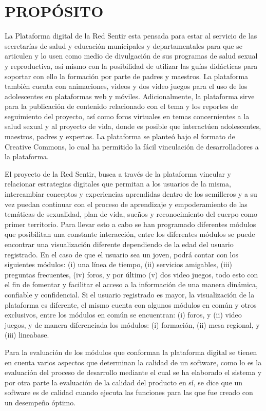 \documentclass[a4paper]{article}
\begin{document}
\section{PROPÓSITO}\label{sec:propositos}
La Plataforma digital de la Red Sentir esta pensada para estar al servicio de las secretarías de salud y educación municipales y departamentales para que se articulen y lo usen como medio de divulgación de sus programas de salud sexual y reproductiva, así mismo con la posibilidad de utilizar las guías didácticas para soportar con ello la formación por parte de padres y maestros. La plataforma también cuenta con animaciones, videos y dos video juegos para el uso de los adolescentes en plataformas web y móviles. Adicionalmente, la plataforma sirve para la publicación de contenido relacionado con el tema y los reportes de seguimiento del proyecto, así como foros virtuales en temas concernientes a la salud sexual y al proyecto de vida, donde es posible que interactúen adolescentes, maestros, padres y expertos. La plataforma se planteó bajo el formato de Creative Commons, lo cual ha permitido la fácil vinculación de desarrolladores a la plataforma.

El proyecto de la Red Sentir, busca a través de la plataforma vincular y relacionar estrategias digitales que permitan a los usuarios de la misma, intercambiar conceptos y experiencias aprendidas dentro de los semilleros y a su vez puedan continuar con el proceso de aprendizaje y empoderamiento de las temáticas de sexualidad, plan de vida, sueños y reconocimiento del cuerpo como primer territorio. Para llevar esto a cabo se han programado diferentes módulos que posibilitan una constante interacción, entre los diferentes módulos se puede encontrar una visualización diferente dependiendo de la edad del usuario registrado. 
En el caso de que el usuario sea un joven, podrá contar con los siguientes módulos: (i) una línea de tiempo, (ii) servicios amigables, (iii) preguntas frecuentes, (iv) foros, y por último (v) dos video juegos, todo esto con el fin de fomentar y facilitar el acceso a la información de una manera dinámica, confiable y confidencial. Si el usuario registrado es mayor, la visualización de la plataforma es diferente, el mismo cuenta con algunos módulos en común y otros exclusivos, entre los módulos en común se encuentran: (i) foros, y (ii) video juegos, y de manera diferenciada los módulos:  (i) formación, (ii) mesa regional, y (iii) lineabase.

Para la evaluación de los módulos que conforman la plataforma digital se tienen en cuenta varios aspectos que determinan la calidad de un software, como lo es la evaluación del proceso de desarrollo mediante el cual se ha elaborado el sistema y por otra parte la evaluación de la calidad del producto en sí, se dice que un software es de calidad cuando ejecuta las funciones para las que fue creado con un desempeño óptimo.
\end{document}
